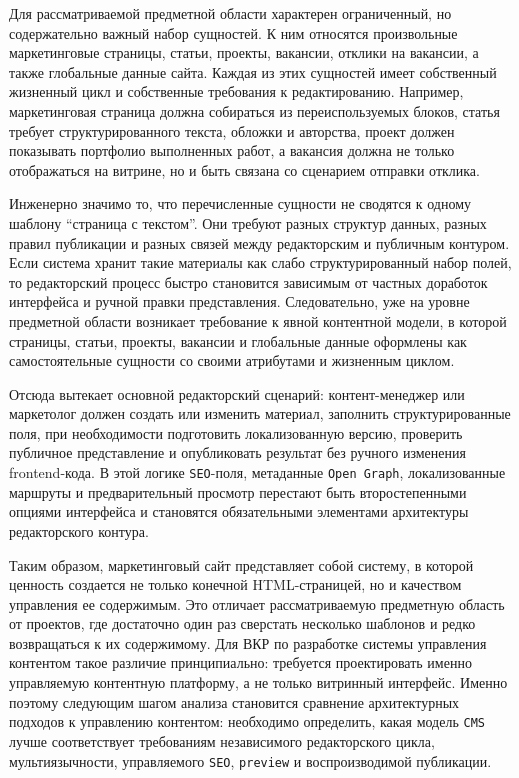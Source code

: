 Для рассматриваемой предметной области характерен ограниченный, но содержательно важный
набор сущностей. К ним относятся произвольные маркетинговые страницы, статьи, проекты,
вакансии, отклики на вакансии, а также глобальные данные сайта. Каждая из этих сущностей
имеет собственный жизненный цикл и собственные требования к редактированию. Например,
маркетинговая страница должна собираться из переиспользуемых блоков, статья требует
структурированного текста, обложки и авторства, проект должен показывать портфолио
выполненных работ, а вакансия должна не только отображаться на витрине, но и быть связана
со сценарием отправки отклика.

Инженерно значимо то, что перечисленные сущности не сводятся к одному шаблону
``страница с текстом''. Они требуют разных структур данных, разных правил публикации и
разных связей между редакторским и публичным контуром. Если система хранит такие
материалы как слабо структурированный набор полей, то редакторский процесс быстро
становится зависимым от частных доработок интерфейса и ручной правки представления.
Следовательно, уже на уровне предметной области возникает требование к явной
контентной модели, в которой страницы, статьи, проекты, вакансии и глобальные данные
оформлены как самостоятельные сущности со своими атрибутами и жизненным циклом.

Отсюда вытекает основной редакторский сценарий: контент-менеджер или маркетолог должен
создать или изменить материал, заполнить структурированные поля, при необходимости
подготовить локализованную версию, проверить публичное представление и опубликовать
результат без ручного изменения frontend-кода. В этой логике \texttt{SEO}-поля,
метаданные \texttt{Open Graph}, локализованные маршруты и предварительный просмотр
перестают быть второстепенными опциями интерфейса и становятся обязательными элементами
архитектуры редакторского контура.

Таким образом, маркетинговый сайт представляет собой систему, в которой ценность создается
не только конечной HTML-страницей, но и качеством управления ее содержимым. Это отличает
рассматриваемую предметную область от проектов, где достаточно один раз сверстать
несколько шаблонов и редко возвращаться к их содержимому. Для ВКР по разработке системы
управления контентом такое различие принципиально: требуется проектировать именно
управляемую контентную платформу, а не только витринный интерфейс. Именно поэтому
следующим шагом анализа становится сравнение архитектурных подходов к управлению
контентом: необходимо определить, какая модель \texttt{CMS} лучше соответствует
требованиям независимого редакторского цикла, мультиязычности, управляемого
\texttt{SEO}, \texttt{preview} и воспроизводимой публикации.

